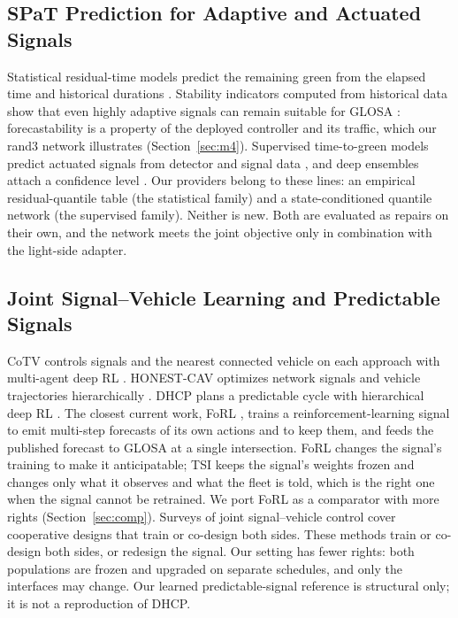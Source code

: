 \subsection{SPaT Prediction for Adaptive and Actuated Signals}
Statistical residual-time models predict the remaining green from the elapsed time and historical durations
\cite{bodenheimer2014,mahler2014}. Stability indicators computed from historical data show that even highly adaptive signals can remain
suitable for GLOSA \cite{otto2025}: forecastability is a property of the deployed controller and its traffic, which our rand3 network
illustrates (Section~\ref{sec:m4}). Supervised time-to-green models predict actuated signals from detector and signal data
\cite{genser2024}, and deep ensembles attach a confidence level \cite{eteifa2025}. Our providers belong to these lines: an empirical
residual-quantile table (the statistical family) and a state-conditioned quantile network (the supervised family). Neither is new. Both are
evaluated as repairs on their own, and the network meets the joint objective only in combination with the light-side adapter.

\subsection{Joint Signal--Vehicle Learning and Predictable Signals}
CoTV controls signals and the nearest connected vehicle on each approach with multi-agent deep RL \cite{guo2023}. HONEST-CAV optimizes
network signals and vehicle trajectories hierarchically \cite{zhang2026}. DHCP plans a predictable cycle with hierarchical deep RL
\cite{gu2025}. The closest current work, FoRL \cite{gerner2026forl}, trains a reinforcement-learning signal to emit multi-step forecasts
of its own actions and to keep them, and feeds the published forecast to GLOSA at a single intersection. FoRL changes the signal's
training to make it anticipatable; TSI keeps the signal's weights frozen and changes only what it observes and what the fleet is told,
which is the right one when the signal cannot be retrained. We port FoRL as a comparator with more rights (Section~\ref{sec:comp}). Surveys of joint signal--vehicle control
\cite{guo2019survey,li2023survey,zhang2024survey} cover cooperative designs that train or co-design both sides. These methods train or co-design both sides, or redesign the signal. Our setting has fewer rights: both populations are
frozen and upgraded on separate schedules, and only the interfaces may change. Our learned predictable-signal reference is structural
only; it is not a reproduction of DHCP.

